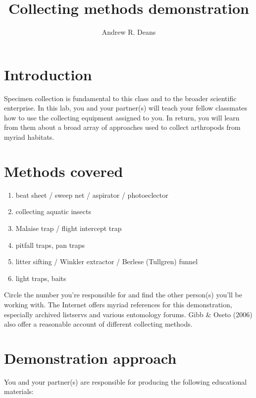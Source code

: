 \documentclass[letterpaper, 11pt]{article}
\title{Collecting methods demonstration}
\author{Andrew R. Deans}
\begin{document}
\cleanlookdateon %
\maketitle
\thispagestyle{fancy}
\section*{Introduction}
Specimen collection is fundamental to this class and to the broader scientific enterprise. In this lab, you and your partner(s) will teach your fellow classmates how to use the collecting equipment assigned to you. In return, you will learn from them about a broad array of approaches used to collect arthropods from myriad habitats.

\section*{Methods covered}

\begin{enumerate}
\item beat sheet / sweep net / aspirator / photoeclector
\item collecting aquatic insects 
\item Malaise trap / flight intercept trap
\item pitfall traps, pan traps
\item litter sifting / Winkler extractor / Berlese (Tullgren) funnel
\item light traps, baits
\end{enumerate}


Circle the number you’re responsible for and find the other person(s) you’ll be working with. The Internet offers myriad references for this demonstration, especially archived listservs and various entomology forums. Gibb \& Oseto (2006) also offer a reasonable account of different collecting methods.

\section*{Demonstration approach}
You and your partner(s) are responsible for producing the following educational materials:
\end{document}

